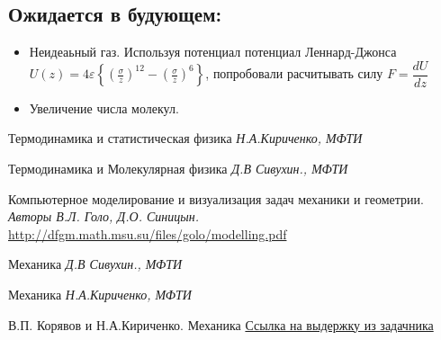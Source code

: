 \documentclass[twoside,twocolumn, 11pt]{article}
\theoremstyle{plain}
\theoremstyle{definition}
\begin{document}
\subsection{Ожидается в будующем:}
\begin{itemize}
\item Неидеаьный газ.
Используя потенциал потенциал Леннард-Джонса $ U(z)=4 \varepsilon\left\{\left(\frac{\sigma}{z}\right)^{12}-\left(\frac{\sigma}{z}\right)^{6}\right\}$, попробовали
расчитывать силу $F = \dfrac{dU}{dz}$
\item Увеличение числа молекул.
\end{itemize}


\begin{thebibliography}{99} %

Термодинамика и статистическая физика {\em
Н.А.Кириченко, МФТИ}

Термодинамика и Молекулярная физика {\em
Д.В Сивухин., МФТИ}

Компьютерное моделирование и визуализация задач механики и
геометрии. {\em Авторы В.Л. Голо, Д.О. Синицын.}
\href{http://dfgm.math.msu.su/files/golo/modelling.pdf}{http://dfgm.math.msu.su/files/golo/modelling.pdf}

Механика {\em
Д.В Сивухин., МФТИ}

Механика {\em
Н.А.Кириченко, МФТИ}

В.П. Корявов и Н.А.Кириченко. Механика
\href{https://vk.com/doc85020018_467835549?hash=d80f20a3d0b8f6643c&dl=bc29371e14b5f0ebd0}{Ссылка на выдержку из задачника}

\end{thebibliography}

\end{document}
